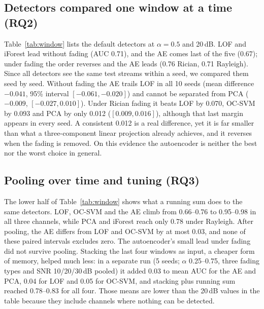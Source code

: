 \documentclass[conference]{IEEEtran}
\begin{document}
\subsection{Detectors compared one window at a time (RQ2)}
Table~\ref{tab:window} lists the default detectors at $\alpha=0.5$ and 20\,dB. LOF and iForest lead without fading (AUC 0.71), and the AE comes last of the five (0.67); under fading the order reverses and the AE leads (0.76 Rician, 0.71 Rayleigh). Since all detectors see the same test streams within a seed, we compared them seed by seed. Without fading the AE trails LOF in all 10 seeds (mean difference $-0.041$, 95\% interval $[-0.061,-0.020]$) and cannot be separated from PCA ($-0.009$, $[-0.027,0.010]$). Under Rician fading it beats LOF by 0.070, OC-SVM by 0.093 and PCA by only 0.012 ($[0.009,0.016]$), although that last margin appears in every seed. A consistent 0.012 is a real difference, yet it is far smaller than what a three-component linear projection already achieves, and it reverses when the fading is removed. On this evidence the autoencoder is neither the best nor the worst choice in general.

\subsection{Pooling over time and tuning (RQ3)}
The lower half of Table~\ref{tab:window} shows what a running sum does to the same detectors. LOF, OC-SVM and the AE climb from 0.66--0.76 to 0.95--0.98 in all three channels, while PCA and iForest reach only 0.78 under Rayleigh. After pooling, the AE differs from LOF and OC-SVM by at most 0.03, and none of these paired intervals excludes zero. The autoencoder's small lead under fading did not survive pooling. Stacking the last four windows as input, a cheaper form of memory, helped much less: in a separate run (5 seeds; $\alpha$ 0.25--0.75, three fading types and SNR 10/20/30\,dB pooled) it added 0.03 to mean AUC for the AE and PCA, 0.04 for LOF and 0.05 for OC-SVM, and stacking plus running sum reached 0.78--0.83 for all four. Those means are lower than the 20\,dB values in the table because they include channels where nothing can be detected.
\end{document}

